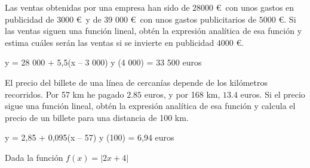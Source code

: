 \documentclass[addpoints,spanish, 12pt,a4paper]{exam}
\begin{document}
\begin{questions}

\question Las ventas obtenidas por una empresa han sido de $28000$ \euro \ con unos gastos
en publicidad de $3000$ \euro \ y de 39 000 \euro \ con unos gastos publicitarios de
$5 000$ \euro.
Si las ventas siguen una función lineal, obtén la expresión analítica de esa función y estima cuáles serán las ventas si se invierte en publicidad $4 000$ \euro.
\begin{solution}
    y = 28 000 + 5,5(x – 3 000)
y (4 000) = 33 500 euros
\end{solution}

\question El precio del billete de una línea de cercanías depende de los kilómetros recorridos. Por 57 km he pagado $2.85$ euros, y por 168 km, $13.4$ euros. Si el precio sigue una función lineal, obtén la expresión analítica de esa función y calcula el precio de un billete para una distancia de 100 km.
\begin{solution}
    y = 2,85 + 0,095(x – 57)
y (100) = 6,94 euros
\end{solution}

\question Dada la función $f(x)=\left|2x+4\right|$
\end{questions}
\end{document}
